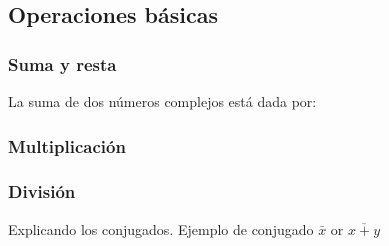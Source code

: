 \subsection{Operaciones básicas}


\subsubsection{Suma y resta}
La suma de dos números complejos está dada por:

    
\subsubsection{Multiplicación}
\subsubsection{División}

Explicando los conjugados. Ejemplo de conjugado $\bar{x}$ or $\overline{x + y}$